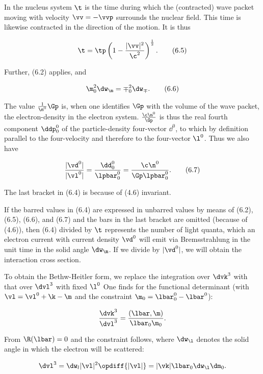 \documentclass{article}
\newcommand{\nequ}[2]{
\begin{align*}
#1
\tag{#2}
\end{align*}
}
\newcommand{\uequ}[1]{
\begin{align*}
#1
\end{align*}
}
\newcommand{\inv}[1]{\frac{1}{#1}}
\begin{document}
In the nucleus system $\t$ is the time during which the (contracted) wave packet moving with velocity $\vv=-\vvp$ surrounds the nuclear field. This time is likewise contracted in the direction of the motion. It is thus
\nequ{
\t=\tp\left(1-\frac{|\vv|^2}{\c^2}\right)^{\inv{2}}.
}{6.5}
Further, (6.2) applies, and
\nequ{
\m_0^2\dw_\m=\mp_0^2\dw_\mp.
}{6.6}
The value $\inv{\n^0}{\Gp}$ is, when one identifies $\Gp$ with the volume of the wave packet, the electron-density in the electron system. $\frac{\c\n^0}{\Gp}$ is thus the real fourth component $\ddp^0_0$ of the particle-density four-vector $\dd^0$, to which by definition parallel to the four-velocity and therefore to the four-vector $\l^0$. Thus we also have
\nequ{
\frac{|\vd^0|}{|\vl^0|} = \frac{\dd^0_0}{\lpbar^0_0} = \frac{\c\n^0}{\Gp\lpbar^0_0}.
}{6.7}
The last bracket in (6.4) is because of (4.6) invariant.

If the barred values in (6.4) are expressed in unbarred values by means of (6.2), (6.5), (6.6), and (6.7) and the bars in the last bracket are omitted (because of (4.6)), then (6.4) divided by $\t$ represents the number of light quanta, which an electron current with current density $\vd^0$ will emit via Bremsstrahlung in the unit time in the solid angle $\dw_\m$. If we divide by $|\vd^0|$, we will obtain the interaction cross section.

To obtain the Bethw-Heitler form, we replace the integration over $\dvk^3$ with that over $\dvl^3$ with fixed $\l^0$ One finds for the functional determinant (with $\vl=\vl^0+\k-\m$ and the constraint $\m_0=\lbar^0_0-\lbar^0$):
\uequ{
\frac{\dvk^3}{\dvl^3} = \frac{(\lbar,\m)}{\lbar_0\m_0}.
}
From $\R(\lbar)=0$ and the constraint follows, where $\dw_\l$ denotes the solid angle in which the electron will be scattered:
\uequ{
\dvl^3 = \dw_l|\vl|^2\opdiff{|\vl|} = |\vk|\lbar_0\dw_\l\dm_0.
}
\end{document}
